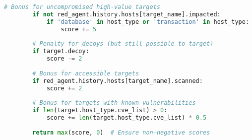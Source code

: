 \documentclass[12pt,a4paper]{article}
\begin{document}
\begin{lstlisting}[language=Python, caption=Custom Red Agent Strategy]
        # Bonus for uncompromised high-value targets
        if not red_agent.history.hosts[target_name].impacted:
            if 'database' in host_type or 'transaction' in host_type:
                score += 5
        
        # Penalty for decoys (but still possible to target)
        if target.decoy:
            score -= 2
        
        # Bonus for accessible targets
        if red_agent.history.hosts[target_name].scanned:
            score += 2
        
        # Bonus for targets with known vulnerabilities
        if len(target.host_type.cve_list) > 0:
            score += len(target.host_type.cve_list) * 0.5
        
        return max(score, 0)  # Ensure non-negative scores
\end{lstlisting}
\end{document}
